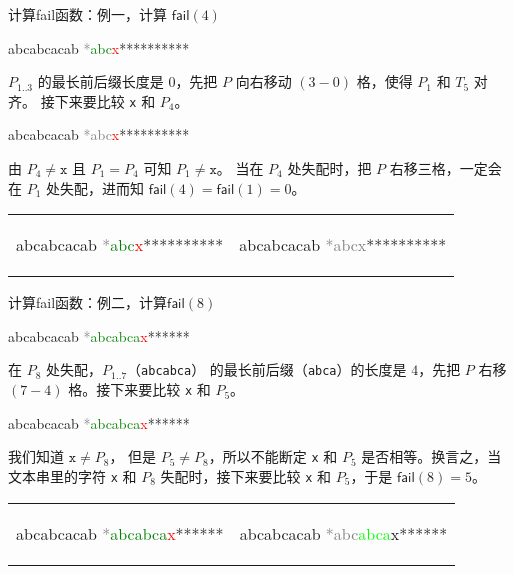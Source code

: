 \documentclass{ctexbeamer}
\newcommand{\red}[1]{\textcolor{red}{#1}}
\newcommand{\green}[1]{\textcolor{green}{#1}}
\newcommand{\gray}[1]{\textcolor{gray}{#1}}
\newcommand{\lime}[1]{\textcolor{lime}{#1}}
\newcommand{\str}[1]{\texttt{#1}}
\newcommand{\fail}{\mathsf{fail}}
\begin{document}
\begin{frame}[fragile]{计算fail函数：例一，计算 $\fail(4)$}

\begin{tverb}
 abcabcacab
\gray{*}\green{abc}\red{x}{**********}
\end{tverb}

$P_{1..3}$ 的最长前后缀长度是 $0$，先把 $P$ 向右移动 $(3-0)$ 格，使得 $P_1$ 和 $T_5$ 对齐。
接下来要比较 \str{x} 和 $P_4$。

\begin{tverb}
    abcabcacab
\gray{*abc}\red{x}{**********}
\end{tverb}

由 $P_4 \ne \str{x}$ 且 $P_1 = P_4$ 可知 $P_1 \ne \str{x}$。
当在 $P_4$ 处失配时，把 $P$ 右移三格，一定会在 $P_1$ 处失配，进而知 $\fail(4) = \fail(1) = 0$。

\begin{tabular}{p{} p{}}
\begin{tverb}
 abcabcacab
\gray{*}\green{abc}\red{x}{**********}
\end{tverb}
 &
\begin{tverb}
     abcabcacab
\gray{*abcx}{**********}
\end{tverb}

\end{tabular}


\end{frame}


\begin{frame}[fragile]{计算fail函数：例二，计算$\fail(8)$}

\begin{tverb}
 abcabcacab
\gray{*}\green{abcabca}\red{x}******
\end{tverb}

在 $P_8$ 处失配，$P_{1..7}$（\str{abcabca}） 的最长前后缀（\str{abca}）的长度是 $4$，先把 $P$ 右移 $(7 - 4)$ 格。接下来要比较 \str{x} 和 $P_5$。

\begin{tverb}
    abcabcacab
\gray{*}\green{abcabca}\red{x}******
\end{tverb}

我们知道 $\str{x} \ne P_8$， 但是 $P_5 \ne P_8$，所以不能断定 \str{x} 和 $P_5$ 是否相等。换言之，当文本串里的字符 \str{x} 和 $P_8$ 失配时，接下来要比较 \str{x} 和 $P_5$，于是 $\fail(8) = 5$。

\begin{tabular}{p{} p{}}
\begin{tverb}
 abcabcacab
\gray{*}\green{abcabca}\red{x}******
\end{tverb}
 &
\begin{tverb}
    abcabcacab
\gray{*abc}\lime{abca}x******
\end{tverb}

\end{tabular}

\end{frame}
\end{document}
